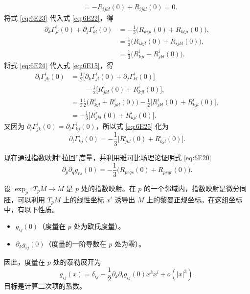 \begin{enumerate}
\begin{equation*}
\begin{aligned}
   &=-R_{ijkl}(0)+R_{ijkl}(0)=0.
\end{aligned}
\tag{6E23}\label{eq:6E23}
\end{equation*}
将式 \eqref{eq:6E23} 代入式 \eqref{eq:6E22}，得
\begin{equation*}
\begin{aligned}
 \partial_k\Gamma^i_{jl}(0)+\partial_j\Gamma^i_{kl}(0)
  &=-\frac13\bigl(R_{kijl}(0)+R_{klji}(0)\bigr),\\
  &=\frac13\bigl(R_{ikjl}(0)+R_{ijkl}(0)\bigr),\\
  &=\frac13\bigl(R^i_{kjl}+R^i_{jkl}(0)\bigr).
\end{aligned}
\tag{6E24}\label{eq:6E24}
\end{equation*}
将式 \eqref{eq:6E24} 代入式 \eqref{eq:6E15}，得
\begin{equation*}
\begin{aligned}
 \partial_l\Gamma^i_{jk}(0)
  &=\frac12\bigl[\partial_k\Gamma^i_{jl}(0)+\partial_j\Gamma^i_{kl}(0)\bigr]\\
  &\qquad-\frac12\bigl[R^i_{jkl}(0)+R^i_{kjl}(0)\bigr],\\
  &=\frac13\frac12\bigl(R^i_{kjl}+R^i_{jkl}(0)\bigr)
     -\frac12\bigl[R^i_{jkl}(0)+R^i_{kjl}(0)\bigr],\\
  &=-\frac13\bigl[R^i_{jkl}(0)+R^i_{kjl}(0)\bigr].
\end{aligned}
\tag{6E25}\label{eq:6E25}
\end{equation*}
又因为 $\partial_l\Gamma^i_{jk}(0)=\partial_l\Gamma^i_{kj}(0)$，所以式 \eqref{eq:6E25} 化为
\begin{equation*}
  \partial_l\Gamma^i_{kj}(0)=-\frac13\bigl[R^i_{jkl}(0)+R^i_{kjl}(0)\bigr].
  \tag{6E26}\label{eq:6E26}
\end{equation*}
\end{enumerate}

现在通过指数映射“拉回”度量，并利用雅可比场理论证明式 \eqref{eq:6E20}
\[
  \partial_p\partial_qg_{rs}(0)=-\frac13\bigl(R_{prqs}(0)+R_{psqr}(0)\bigr).
\]

设 $\exp_p\colon T_pM\to M$ 是 $p$ 处的指数映射。在 $p$ 的一个邻域内，指数映射是微分同胚，可以利用 $T_pM$ 上的线性坐标 $x^i$ 诱导出 $M$ 上的黎曼正规坐标。在这组坐标中，有以下性质。
\begin{itemize}
\item $g_{ij}(0)$（度量在 $p$ 处为欧氏度量）。
\item $\partial_k g_{ij}(0)$（度量的一阶导数在 $p$ 处为零）。
\end{itemize}
因此，度量在 $p$ 处的泰勒展开为%
%
\begin{equation*}
  g_{ij}(x)=\delta_{ij}+\frac12\partial_k\partial_l g_{ij}(0)x^k x^l+o(|x|^3).
  \tag{6E27}\label{eq:6E27}
\end{equation*}
目标是计算二次项的系数。

